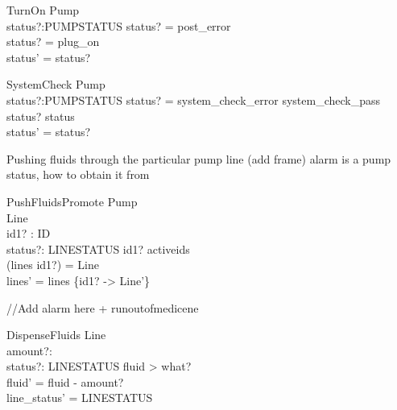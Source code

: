 \documentclass{article}
\begin{document}
	\begin{schema}{TurnOn}
		\Delta Pump \\
		status?:PUMPSTATUS
	\where 
		status? = post\_error  \\
		status? = plug\_on \\
		status' = status?
	\end{schema}
			
	\begin{schema}{SystemCheck}
		\Delta Pump\\
		status?:PUMPSTATUS
	\where 
		status? = system\_check\_error \lor system\_check\_pass \\
		status? \neq status\\
		status' = status?
	\end{schema}
	
	Pushing fluids through the particular pump line (add frame) alarm is a pump status, how to obtain it from
	
	\begin{schema}{PushFluidsPromote}
		\Delta Pump	\\
		\Delta Line \\
		id1? : ID \\
		status?: LINESTATUS
	\where 
		id1? \in activeids \\
		(lines id1?) = \theta Line \\
		lines' = lines \oplus \{id1? -> \theta Line'\} \\		
	\end{schema}
	
	//Add alarm here + runoutofmedicene
	\begin{schema}{DispenseFluids}
		\Delta Line \\
		amount?: \nat \\
		status?: LINESTATUS
	\where 
		fluid > what? \\
		fluid' = fluid - amount? \\
		line_status' = LINESTATUS
	\end{schema}
\end{document}
